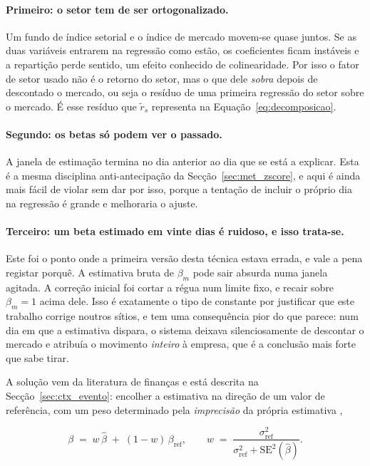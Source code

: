 \paragraph{Primeiro: o setor tem de ser ortogonalizado.}
Um fundo de índice setorial e o índice de mercado movem-se quase juntos. Se as duas variáveis
entrarem na regressão como estão, os coeficientes ficam instáveis e a repartição perde sentido, um
efeito conhecido de colinearidade. Por isso o fator de setor usado não é o retorno do setor, mas o
que dele \emph{sobra} depois de descontado o mercado, ou seja o resíduo de uma primeira regressão do
setor sobre o mercado. É esse resíduo que $\tilde r_s$ representa na Equação~\ref{eq:decomposicao}.

\paragraph{Segundo: os betas só podem ver o passado.}
A janela de estimação termina no dia anterior ao dia que se está a explicar. Esta é a mesma
disciplina anti-antecipação da Secção~\ref{sec:met_zscore}, e aqui é ainda mais fácil de violar sem
dar por isso, porque a tentação de incluir o próprio dia na regressão é grande e melhoraria o ajuste.

\paragraph{Terceiro: um beta estimado em vinte dias é ruidoso, e isso trata-se.}
Este foi o ponto onde a primeira versão desta técnica estava errada, e vale a pena registar porquê.
A estimativa bruta de $\beta_m$ pode sair absurda numa janela agitada. A correção inicial foi cortar
a régua num limite fixo, e recair sobre $\beta_m = 1$ acima dele. Isso é exatamente o tipo de
constante por justificar que este trabalho corrige noutros sítios, e tem uma consequência pior do
que parece: num dia em que a estimativa dispara, o sistema deixava silenciosamente de descontar o
mercado e atribuía o movimento \emph{inteiro} à empresa, que é a conclusão mais forte que sabe tirar.

A solução vem da literatura de finanças e está descrita na Secção~\ref{sec:ctx_evento}: encolher a
estimativa na direção de um valor de referência, com um peso determinado pela \emph{imprecisão} da
própria estimativa \autocite{vasicek1973beta},

\begin{equation}
\beta \;=\; w\,\hat\beta \;+\; (1-w)\,\beta_{\text{ref}},
\qquad
w \;=\; \frac{\sigma^2_{\text{ref}}}{\sigma^2_{\text{ref}} + \mathrm{SE}^2(\hat\beta)} .
\label{eq:vasicek}
\end{equation}

